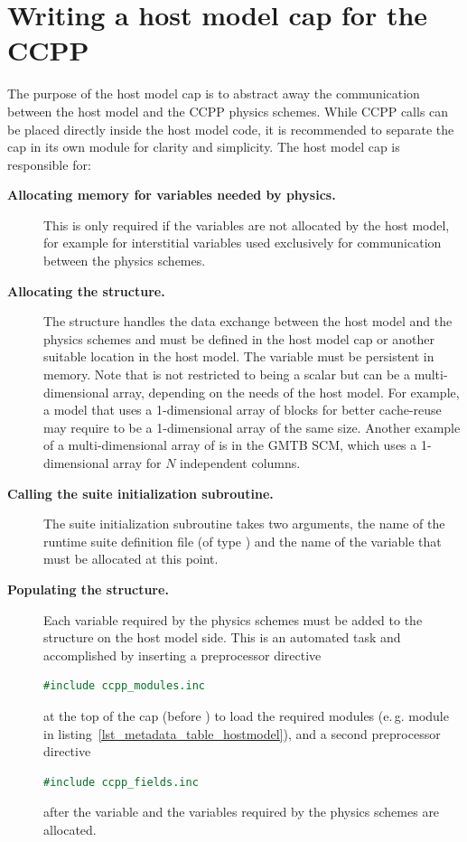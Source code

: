 \section{Writing a host model cap for the CCPP}
\label{sec_hostmodel_cap}
The purpose of the host model cap is to abstract away the communication between the host model and the CCPP physics schemes. While CCPP calls can be placed directly inside the host model code, it is recommended to separate the cap in its own module for clarity and simplicity. The host model cap is responsible for:
\begin{description}
\item[\textbf{Allocating memory for variables needed by physics.}] This is only required if the variables are not allocated by the host model, for example for interstitial variables used exclusively for communication between the physics schemes.
\item[\textbf{Allocating the  structure.}] The  structure handles the data exchange between the host model and the physics schemes and must be defined in the host model cap or another suitable location in the host model. The  variable must be persistent in memory. Note that  is not restricted to being a scalar but can be a multi-dimensional array, depending on the needs of the host model. For example, a model that uses a 1-dimensional array of blocks for better cache-reuse may require  to be a 1-dimensional array of the same size. Another example of a multi-dimensional array of  is in the GMTB SCM, which uses a 1-dimensional  array for $N$ independent columns.
\item[\textbf{Calling the suite initialization subroutine.}] The suite initialization subroutine takes two arguments, the name of the runtime suite definition file (of type ) and the name of the  variable that must be allocated at this point.
\item[\textbf{Populating the  structure.}] Each variable required by the physics schemes must be added to the  structure on the host model side. This is an automated task and accomplished by inserting a preprocessor directive
\begin{lstlisting}[language=Fortran]
#include ccpp_modules.inc
\end{lstlisting}
at the top of the cap (before ) to load the required modules (e.\,g. module  in listing~\ref{lst_metadata_table_hostmodel}), and a second preprocessor directive
\begin{lstlisting}[language=Fortran]
#include ccpp_fields.inc
\end{lstlisting}
after the  variable and the variables required by the physics schemes are allocated.


\end{description}
